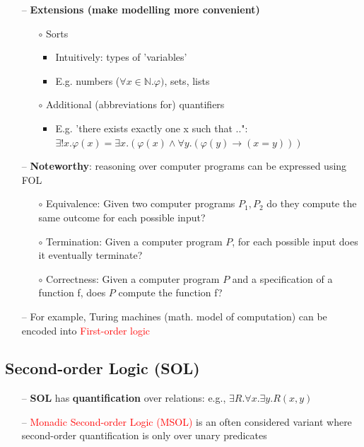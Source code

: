 \begin{itemize}
    \newpage
    \item[--] \textbf{Extensions (make modelling more convenient)}
    \begin{itemize}
        \item[$\circ$] Sorts
        \begin{itemize}
            \item Intuitively: types of 'variables'
            \item E.g. numbers ($\forall x \in \mathbb{N}.\varphi)$, sets, lists
        \end{itemize}
        \item[$\circ$] Additional (abbreviations for) quantifiers
        \begin{itemize}
            \item E.g. 'there exists exactly one x such that ..": \\
            
            $\exists !x.\varphi(x) = \exists x.(\varphi(x) \wedge \forall y.(\varphi(y) \rightarrow (x = y)))$
        \end{itemize}
    \end{itemize}
    \vspace{0.2cm}
    \item[--] \textbf{Noteworthy}: reasoning over computer programs can be expressed using FOL
    \begin{itemize}
        \item[$\circ$] \textcolor{PineGreen}{Equivalence}: Given two computer programs $P_1, P_2$ do they compute the same outcome for each possible input?
        \item[$\circ$] \textcolor{PineGreen}{Termination}: Given a computer program $P$, for each possible input does it eventually terminate?
        \item[$\circ$] \textcolor{PineGreen}{Correctness}: Given a computer program $P$ and a specification of a function f, does $P$ compute the function f?
    \end{itemize}
    \item[--] For example, \textcolor{PineGreen}{Turing machines} (math. model of computation) can be encoded into \textcolor{red}{First-order logic}

\end{itemize}

\subsection{Second-order Logic (SOL)}
\begin{itemize}
    \item[--] \textbf{SOL} has \textbf{quantification} over relations: e.g., $\exists R . \forall x . \exists y . R(x,y)$
    \item[--] \textcolor{red}{Monadic Second-order Logic (MSOL)} is an often considered variant where second-order quantification is only over unary predicates
\end{itemize}

